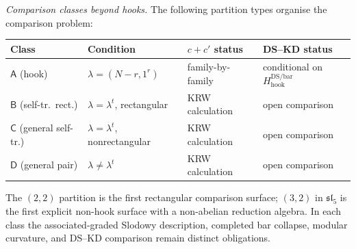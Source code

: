 \begin{remark}
\noindent\textit{Comparison classes beyond hooks.}
The following partition types organise the comparison problem:
\begin{center}
\renewcommand{\arraystretch}{1.15}
\begin{tabular}{llll}
\toprule
\textbf{Class} & \textbf{Condition} &
 \textbf{$c + c'$ status} & \textbf{DS--KD status} \\
\midrule
$\mathsf{A}$ (hook) & $\lambda = (N{-}r, 1^r)$ &
 family-by-family & conditional on $H_{\mathrm{hook}}^{\mathrm{DS/bar}}$ \\
$\mathsf{B}$ (self-tr.\ rect.) & $\lambda = \lambda^t$, rectangular &
 KRW calculation & open comparison \\
$\mathsf{C}$ (general self-tr.) & $\lambda = \lambda^t$, nonrectangular &
 KRW calculation & open comparison \\
$\mathsf{D}$ (general pair) & $\lambda \neq \lambda^t$ &
 KRW calculation & open comparison \\
\bottomrule
\end{tabular}
\end{center}

\noindent
The $(2,2)$ partition is the first rectangular comparison surface;
$(3,2)$ in $\mathfrak{sl}_5$ is the first explicit non-hook surface with a
non-abelian reduction algebra.  In each class the associated-graded Slodowy
description, completed bar collapse, modular curvature, and DS--KD comparison
remain distinct obligations.
\end{remark}

